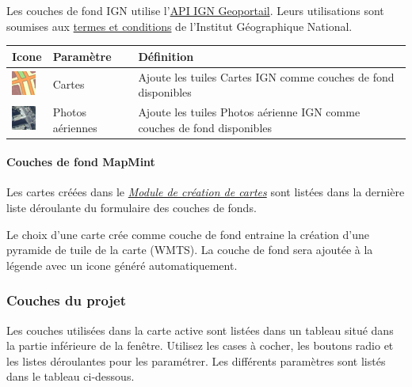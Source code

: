 \documentclass[letterpaper,10pt,french]{sphinxmanual}
\begin{document}
Les couches de fond IGN utilise l'\href{http://api.ign.fr/services\#web}{API IGN Geoportail}. Leurs utilisations sont soumises aux \href{http://api.ign.fr/licences}{termes et conditions} de l'Institut Géographique National.

\begin{tabulary}{\linewidth}{|L|L|L|}
\hline

\textbf{Icone}
 & 
\textbf{Paramètre}
 & 
\textbf{Définition}
\\
\hline
\includegraphics{ignm-layer-icon.png}
 & 
Cartes
 & 
Ajoute les tuiles Cartes IGN comme couches de fond disponibles
\\
\hline
\includegraphics{igns-layer-icon.png}
 & 
Photos aériennes
 & 
Ajoute les tuiles Photos aérienne IGN comme couches de fond disponibles
\\
\hline\end{tabulary}

\paragraph{Couches de fond MapMint}

Les cartes créées dans le {\hyperref[maps/index::doc]{\emph{\emph{Module de création de cartes}}}} sont listées dans la dernière liste déroulante du formulaire des couches de fonds.

Le choix d'une carte crée comme couche de fond entraine la création d'une pyramide de tuile de la carte (WMTS). La couche de fond sera ajoutée à la légende avec un icone généré automatiquement.


\subsubsection{Couches du projet}
\label{apps/appconfig:couches-du-projet}
Les couches utilisées dans la carte active sont listées dans un tableau situé dans la partie inférieure de la fenêtre. Utilisez les cases à cocher, les boutons radio et les listes déroulantes pour les paramétrer. Les différents paramètres sont listés dans le tableau ci-dessous.
\end{document}
